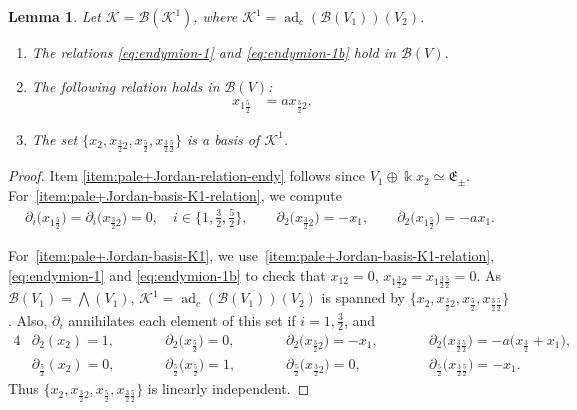 \documentclass[10pt,a4paper]{amsart}
\numberwithin{equation}{section}
\newtheorem{Lemma}[Theorem]{Lemma}
\newcommand{\adc}{\operatorname{ad}_c}
\newcommand{\toba}{\mathscr B}
\newcommand{\K}{{\mathcal{K}}}
\newcommand{\eny}{\mathfrak{E}}
\newcommand{\tresdos}{\frac{3}{2}}
\newcommand{\cincodos}{\frac{5}{2}}
\begin{document}
{\samepage\begin{Lemma}\label{lem:pale+Jordan-basis-K1}
Let $\K = \toba(\K^1)$, where $\K^1 = \adc(\toba(V_1))(V_2)$.
\begin{enumerate}[label=$(\alph*)$]\itemsep=0pt
\item\label{item:pale+Jordan-relation-endy} The relations
\eqref{eq:endymion-1} and \eqref{eq:endymion-1b}
hold in $\toba(V)$.
\item\label{item:pale+Jordan-basis-K1-relation} The following relation holds in $\toba(V)$:
\begin{align}\label{eq:pale+Jordan-def-rel-1}
x_{1\cincodos} &= a x_{\tresdos2}.
\end{align}
\item\label{item:pale+Jordan-basis-K1}
The set $\big\{x_{2}, x_{\tresdos2}, x_{\cincodos}, x_{\tresdos\cincodos}\big\}$ is a basis of $\K^1$.
\end{enumerate}
\end{Lemma}}

\begin{proof} Item \ref{item:pale+Jordan-relation-endy} follows since $V_1 \oplus \Bbbk x_2\simeq \eny_{\pm}$.
For~\ref{item:pale+Jordan-basis-K1-relation}, we compute
\begin{align*}
\partial_i\big(x_{1\cincodos}\big) = \partial_i\big(x_{\tresdos2}\big)=0, \quad
i \in\big\{1,\tfrac{3}{2}, \tfrac{5}{2}\big\},\qquad
\partial_2\big(x_{\tresdos2}\big) =-x_1,\qquad
\partial_2\big(x_{1\cincodos}\big) = -ax_1.
\end{align*}

For~\ref{item:pale+Jordan-basis-K1}, we use~\ref{item:pale+Jordan-basis-K1-relation}, \eqref{eq:endymion-1} and \eqref{eq:endymion-1b} to check that
$x_{12}= 0$, $x_{1\tresdos2} = x_{1\tresdos\cincodos}=0$. As $\toba(V_1) = \bigwedge(V_1)$, $\K^1 = \adc(\toba(V_1))(V_2)$ is spanned by
$\big\{x_{2}, x_{\tresdos2}, x_{\cincodos}, x_{\tresdos\cincodos} \big\}$. Also, $\partial_i$ annihilates each element of this set if $i=1,\tresdos$, and
\begin{alignat*}{4}
&\partial_2(x_{2}) = 1,\qquad && \partial_2\big(x_{\cincodos}\big) = 0, \qquad &&\partial_2\big(x_{\tresdos2}\big) = -x_1, \qquad &&\partial_2\big(x_{\tresdos\cincodos}\big) = -a\big(x_\tresdos+x_1\big),
\\
&\partial_\cincodos(x_{2}) = 0, && \partial_\cincodos\big(x_{\cincodos}\big) = 1, &&\partial_\cincodos\big(x_{\tresdos2}\big) = 0, &&\partial_\cincodos\big(x_{\tresdos\cincodos}\big) = -x_1.
\end{alignat*}
Thus $\big\{x_{2}, x_{\tresdos2}, x_{\cincodos}, x_{\tresdos\cincodos} \big\}$ is linearly independent.
\end{proof}
\end{document}
